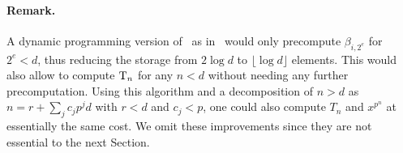 \paragraph*{\bf Remark.}  A dynamic programming version
of~ as in~\cite[Algorithm~5.2]{vzGS92} would
only precompute $\beta_{i,2^e}$ for $2^e<d$, thus reducing the storage
from $2\log d$ to $\lfloor\log d\rfloor$ elements. This would also
allow to compute $\operatorname{T}_n$ for any $n<d$ without needing any further
precomputation. Using this algorithm and a decomposition of $n>d$ as
$n=r+\sum_jc_jp^jd$ with $r<d$ and $c_j<p$, one could also compute
$T_{n}$ and $x^{p^n}$ at essentially the same cost. We omit these
improvements since they are not essential to the next Section.


%
